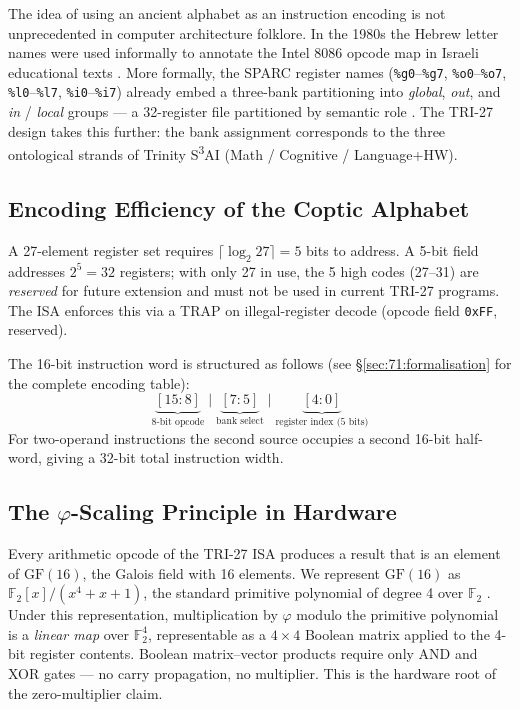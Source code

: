 The idea of using an ancient alphabet as an instruction encoding is not
unprecedented in computer architecture folklore.  In the 1980s the Hebrew
letter names were used informally to annotate the Intel 8086 opcode map
in Israeli educational texts \cite{patterson2014computer}.  More
formally, the SPARC register names (\texttt{\%g0}--\texttt{\%g7},
\texttt{\%o0}--\texttt{\%o7}, \texttt{\%l0}--\texttt{\%l7},
\texttt{\%i0}--\texttt{\%i7}) already embed a three-bank partitioning
into \emph{global}, \emph{out}, and \emph{in} / \emph{local} groups —
a 32-register file partitioned by semantic role
\cite{patterson2014computer}.  The TRI-27 design takes this
further: the bank assignment corresponds to the three ontological
strands of Trinity S\textsuperscript{3}AI (Math / Cognitive / Language+HW).

\subsection{Encoding Efficiency of the Coptic Alphabet}
\label{subsec:71:encoding}

A 27-element register set requires $\lceil \log_2 27 \rceil = 5$ bits
to address.  A 5-bit field addresses $2^5 = 32$ registers; with only
27 in use, the 5 high codes (27--31) are \emph{reserved} for future
extension and must not be used in current TRI-27 programs.  The ISA
enforces this via a \textsc{TRAP} on illegal-register decode
(opcode field \texttt{0xFF}, reserved).

The 16-bit instruction word is structured as follows (see
\S\ref{sec:71:formalisation} for the complete encoding table):
\[
  \underbrace{[15{:}8]}_{\text{8-bit opcode}}
  \;\Big|\;
  \underbrace{[7{:}5]}_{\text{bank select}}
  \;\Big|\;
  \underbrace{[4{:}0]}_{\text{register index (5 bits)}}
\]
For two-operand instructions the second source occupies a second
16-bit half-word, giving a 32-bit total instruction width.

\subsection{The $\varphi$-Scaling Principle in Hardware}
\label{subsec:71:phi-scaling}

Every arithmetic opcode of the TRI-27 ISA produces a result that is
an element of $\mathrm{GF}(16)$, the Galois field with 16 elements.
We represent $\mathrm{GF}(16)$ as $\mathbb{F}_2[x]/(x^4 + x + 1)$,
the standard primitive polynomial of degree 4 over $\mathbb{F}_2$
\cite{macwilliams1977theory}.
Under this representation, multiplication by $\varphi$ modulo the
primitive polynomial is a \emph{linear map} over $\mathbb{F}_2^4$,
representable as a $4 \times 4$ Boolean matrix applied to the 4-bit
register contents.  Boolean matrix--vector products require only
AND and XOR gates — no carry propagation, no multiplier.  This is
the hardware root of the zero-multiplier claim.

